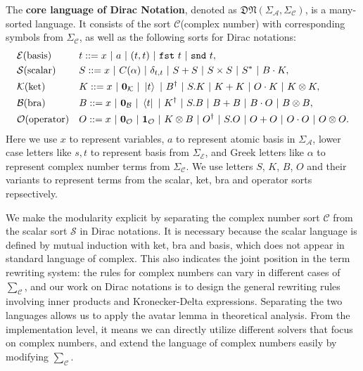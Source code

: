 \documentclass[manuscript, review, timestamp]{acmart}
\newcommand*{\fst}{\texttt{fst}}
\newcommand*{\snd}{\texttt{snd}}
\begin{document}
\begin{definition}
  The \textbf{core language of Dirac Notation}, denoted as $\mathfrak{DN}(\Sigma_\mathcal{A}, \Sigma_\mathcal{C})$, is a many-sorted language. It consists of the sort $\mathcal{C}$(complex number) with corresponding symbols from $\Sigma_\mathcal{C}$, as well as the following sorts for Dirac notations:
  \begin{align*}
    & \mathcal{E} \textrm{(basis)} && t ::= x\ |\ a\ |\ (t, t)\ |\ \fst\ t\ |\ \snd\ t, \\
    & \mathcal{S} \textrm{(scalar)} && S ::= x\ |\ C(\alpha)\ |\ \delta_{t, t}\ |\ S + S\ |\ S \times S\ |\ S^*\ |\ B \cdot K, \\
    & \mathcal{K} \textrm{(ket)} && K ::= x\ |\ \mathbf{0}_\mathcal{K}\ |\ \ket{t}\ |\ B^\dagger\ |\ S.K\ |\ K + K\ |\ O \cdot K\ |\ K \otimes K, \\
    & \mathcal{B} \textrm{(bra)} && B ::= x\ |\ \mathbf{0}_\mathcal{B}\ |\ \bra{t}\ |\ K^\dagger\ |\ S.B\ |\ B + B\ |\ B \cdot O\ |\ B \otimes B, \\
    & \mathcal{O} \textrm{(operator)} && O ::= x\ |\ \mathbf{0}_\mathcal{O}\ |\ \mathbf{1}_\mathcal{O}\ |\ K \otimes B\ |\ O^\dagger\ |\ S.O\ |\ O + O\ |\ O \cdot O\ |\ O \otimes O.
  \end{align*}
  Here we use $x$ to represent variables, $a$ to represent atomic basis in $\Sigma_\mathcal{A}$, lower case letters like $s, t$ to represent basis from $\Sigma_\mathcal{E}$, and Greek letters like $\alpha$ to represent complex number terms from $\Sigma_\mathcal{C}$. We use letters $S$, $K$, $B$, $O$ and their variants to represent terms from the scalar, ket, bra and operator sorts repsectively.

\end{definition}

We make the modularity explicit by separating the complex number sort $\mathcal{C}$ from the scalar sort $\mathcal{S}$ in Dirac notations. It is necessary because the scalar language is defined by mutual induction with ket, bra and basis, which does not appear in standard language of complex. This also indicates the joint position in the term rewriting system: the rules for complex numbers can vary in different cases of $\sum_\mathcal{C}$, and our work on Dirac notations is to design the general rewriting rules involving inner products and Kronecker-Delta expressions. Separating the two languages allows us to apply the avatar lemma in theoretical analysis. From the implementation level, it means we can directly utilize different solvers that focus on complex numbers, and extend the language of complex numbers easily by modifying $\sum_\mathcal{C}$.
\end{document}
